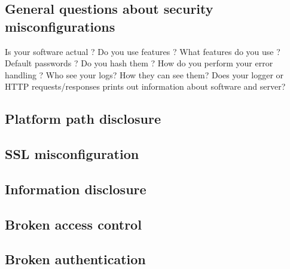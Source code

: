 \subsection{General questions about security misconfigurations}
Is your software actual ? \newline
Do you use features ? What features do you use ? \newline
Default passwords ? Do you hash them ? \newline
How do you perform your error handling ? \newline
Who see your logs? How they can see them? \newline
Does your logger or HTTP requests/responses prints out information about software and server?

\subsection{Platform path disclosure}
\subsection{SSL misconfiguration}
\subsection{Information disclosure}
\subsection{Broken access control}
\subsection{Broken authentication}